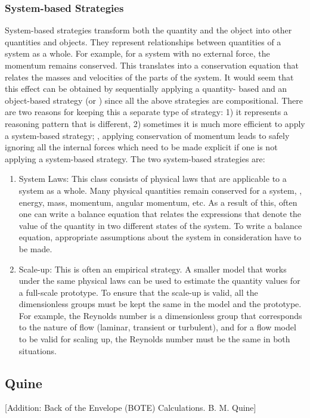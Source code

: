 \subsubsection{System-based Strategies}
System-based strategies transform both the quantity and the object into other quantities and objects. They represent relationships between quantities of a system as a whole. For example, for a system with no external force, the momentum remains conserved. This translates into a conservation equation that relates the masses and velocities of the parts of the system. It would seem that this effect can be obtained by sequentially applying a quantity- based and an object-based strategy (or \vis) since all the above strategies are compositional. There are two reasons for keeping this a separate type of strategy: 1) it represents a reasoning pattern that is different, 2) sometimes it is much more efficient to apply a system-based strategy; \eg, applying conservation of momentum leads to safely ignoring all the internal forces which need to be made explicit if one is not applying a system-based strategy. The two system-based strategies are:
%
\begin{enumerate}
\item System Laws: This class consists of physical laws that are applicable to a system as a whole. Many physical quantities remain conserved for a system, \eg, energy, mass, momentum, angular momentum, etc. As a result of this, often one can write a balance equation that relates the expressions that denote the value of the quantity in two different states of the system. To write a balance equation, appropriate assumptions about the system in consideration have to be made.
%
\item Scale-up: This is often an empirical strategy. A smaller model that works under the same physical laws can be used to estimate the quantity values for a full-scale prototype. To ensure that the scale-up is valid, all the dimensionless groups must be kept the same in the model and the prototype. For example, the Reynolds number is a dimensionless group that corresponds to the nature of flow (laminar, transient or turbulent), and for a flow model to be valid for scaling up, the Reynolds number must be the same in both situations.
\end{enumerate}


\subsection{Quine}
[Addition: Back of the Envelope (BOTE) Calculations. B. M. Quine]


